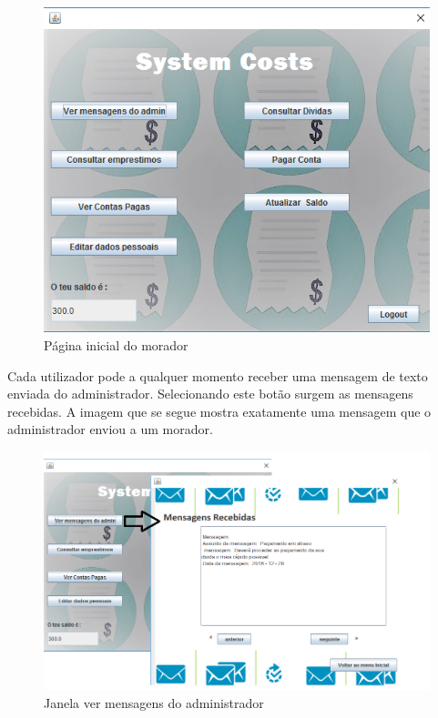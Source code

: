 \begin{figure}[h!]
	\centering
	\includegraphics[scale=0.6]{imagens/interface/moradorpaginicial}  
	\caption{Página inicial do morador}  
\end{figure}


Cada utilizador pode a qualquer momento receber uma mensagem de texto enviada do administrador. Selecionando este botão surgem as mensagens recebidas. A imagem que se segue mostra exatamente uma mensagem que o administrador enviou a um morador.
\begin{figure}[h!]
	\centering
	\includegraphics[scale=0.6]{imagens/interface/vermensagensadmin}  
	\caption{Janela ver mensagens do administrador}  
\end{figure}

